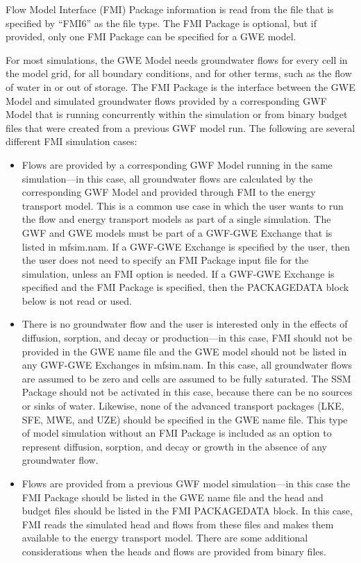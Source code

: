 Flow Model Interface (FMI) Package information is read from the file that is specified by ``FMI6'' as the file type.  The FMI Package is optional, but if provided, only one FMI Package can be specified for a GWE model.

For most simulations, the GWE Model needs groundwater flows for every cell in the model grid, for all boundary conditions, and for other terms, such as the flow of water in or out of storage.  The FMI Package is the interface between the GWE Model and simulated groundwater flows provided by a corresponding GWF Model that is running concurrently within the simulation or from binary budget files that were created from a previous GWF model run.  The following are several different FMI simulation cases:

\begin{itemize}

\item Flows are provided by a corresponding GWF Model running in the same simulation---in this case, all groundwater flows are calculated by the corresponding GWF Model and provided through FMI to the energy transport model.  This is a common use case in which the user wants to run the flow and energy transport models as part of a single simulation.  The GWF and GWE models must be part of a GWF-GWE Exchange that is listed in mfsim.nam.  If a GWF-GWE Exchange is specified by the user, then the user does not need to specify an FMI Package input file for the simulation, unless an FMI option is needed.  If a GWF-GWE Exchange is specified and the FMI Package is specified, then the PACKAGEDATA block below is not read or used.

\item There is no groundwater flow and the user is interested only in the effects of diffusion, sorption, and decay or production---in this case, FMI should not be provided in the GWE name file and the GWE model should not be listed in any GWF-GWE Exchanges in mfsim.nam.  In this case, all groundwater flows are assumed to be zero and cells are assumed to be fully saturated.  The SSM Package should not be activated in this case, because there can be no sources or sinks of water.  Likewise, none of the advanced transport packages (LKE, SFE, MWE, and UZE) should be specified in the GWE name file.  This type of model simulation without an FMI Package is included as an option to represent diffusion, sorption, and decay or growth in the absence of any groundwater flow.

\item Flows are provided from a previous GWF model simulation---in this case the FMI Package should be listed in the GWE name file and the head and budget files should be listed in the FMI PACKAGEDATA block.  In this case, FMI reads the simulated head and flows from these files and makes them available to the energy transport model.  There are some additional considerations when the heads and flows are provided from binary files.


\end{itemize}

